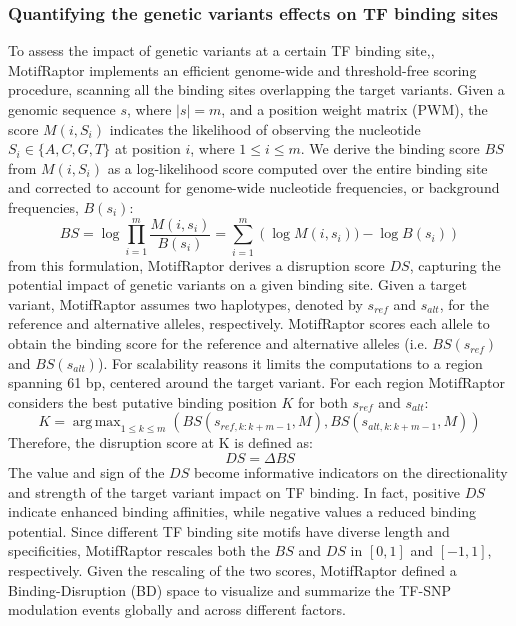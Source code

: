 \documentclass[a4paper, titlepage, openright]{book}
\DeclareMathOperator*{\argmax}{arg\,max}
\newcommand{\motifraptor}{MotifRaptor\xspace}
\begin{document}
\subsubsection{Quantifying the genetic variants effects on TF binding sites}
To assess the impact of genetic variants at a certain TF binding site,, \motifraptor implements an efficient genome-wide and threshold-free scoring procedure, scanning all the binding sites overlapping the target variants. Given a genomic sequence $s$, where $|s|=m$, and a position weight matrix (PWM), the score $M(i,S_{i})$ indicates the likelihood of observing the nucleotide $S_{i}\in\{A,C,G,T\}$ at position $i$, where $1 \leq i \leq m.$ We derive the binding score $BS$ from $M(i,S_{i})$ as a log-likelihood score computed over the entire binding site and corrected to account for genome-wide nucleotide frequencies, or background frequencies, $B(s_{i})$:
\[
	BS = \log{\prod^{m}_{i=1}{\frac{M(i,s_{i})}{B(s_{i})}}} = \sum^{m}_{i=1}{(\log{M(i, s_{i}))} - \log{B(s_{i})})}
\] 
from this formulation, \motifraptor derives a disruption score $DS$, capturing the potential impact of genetic variants on a given binding site. Given a target variant, \motifraptor assumes two haplotypes, denoted by $s_{ref}$ and $s_{alt}$, for the reference and alternative alleles, respectively. \motifraptor scores each allele to obtain the binding score for the reference and alternative alleles (i.e.  $BS(s_{ref})$ and $BS(s_{alt})$). For scalability reasons it limits the computations to a region spanning 61 bp, centered around the target variant. For each region \motifraptor considers the best putative binding position $K$ for both $s_{ref}$ and $s_{alt}$:
\[
	K = \argmax_{1 \leq k \leq m}(BS(s_{ref, k:k+m-1}, M), BS(s_{alt, k:k+m-1}, M))
\]
Therefore, the disruption score at K is defined as:
\[
	DS = \Delta BS
\]
The value and sign of the $DS$ become informative indicators on the directionality and strength of the target variant impact on TF binding. In fact, positive $DS$ indicate enhanced binding affinities, while negative values a reduced binding potential. Since different TF binding site motifs have diverse length and specificities, \motifraptor rescales both the $BS$ and $DS$ in $[0,1]$ and $[-1,1]$, respectively. Given the rescaling of the two scores, \motifraptor defined a Binding-Disruption (BD) space to visualize and summarize the TF-SNP modulation events globally and across different factors.
\end{document}
